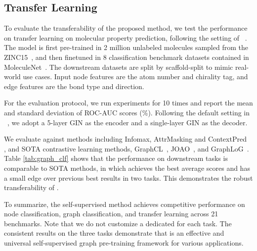 \subsection{Transfer Learning}



 To evaluate the transferability of the proposed method, we test the performance on transfer learning on molecular property prediction, following the setting of ~\cite{hu2020strategies,you2020graph,you2021graph}. The model is first pre-trained in  2 million unlabeled molecules sampled from the ZINC15~\cite{sterling2015zinc}, and then finetuned in 8 classification benchmark datasets contained in MoleculeNet~\cite{wu2018moleculenet}. The downstream datasets are split by scaffold-split to mimic real-world use cases. Input node features are the atom number and chirality tag, and edge features are the bond type and direction. 

For the evaluation protocol,  we run experiments for 10 times and report the mean and standard deviation of ROC-AUC scores (\%). Following the default setting in ~\cite{hu2020strategies},  we adopt a 5-layer GIN as the encoder and a single-layer GIN as the decoder.


We evaluate \model against methods including Infomax, AttrMasking and ContextPred~\cite{hu2020strategies} , and SOTA contrastive learning methods, GraphCL~\cite{you2020graph}, JOAO~\cite{you2021graph}, and GraphLoG~\cite{xu2021self}. Table \ref{tab:graph_clf} shows that the performance on downstream tasks is comparable to SOTA methods, in which \model achieves the best average scores and has a small edge over previous best results in two tasks. 
This demonstrates the robust transferability of \model.


To summarize,  the self-supervised \model  method achieves  competitive performance on node classification, graph classification, and transfer learning across 21 benchmarks. %
Note that we do not customize a dedicated \model for each task. 
The consistent results on the three tasks demonstrate that \model is an effective and universal self-supervised graph pre-training framework for various applications. 










